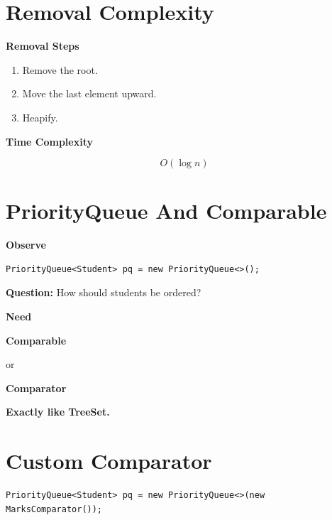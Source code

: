 \documentclass[11pt,a4paper]{book}
\newcommand{\question}[1]{
\vspace{0.5em}
\textbf{Question:} #1?
\vspace{0.2em}
}
\begin{document}
\section{Removal Complexity}

\textcolor{RosettaBlue}{\textbf{Removal Steps}}

\begin{enumerate}[leftmargin=2em]
    \item Remove the root.
    \item Move the last element upward.
    \item Heapify.
\end{enumerate}

\medskip

\textcolor{RosettaDeepGreen}{\textbf{Time Complexity}}

\[
\boxed{O(\log n)}
\]
\section{PriorityQueue And Comparable}

\textcolor{RosettaBlue}{\textbf{Observe}}

\begin{verbatim}
PriorityQueue<Student> pq = new PriorityQueue<>();
\end{verbatim}
\question{How should students be ordered}

\medskip

\textcolor{RosettaJade}{\textbf{Need}}

\begin{center}
\Large
\textbf{Comparable}

\vspace{0.4em}

\textcolor{RosettaGray}{or}

\vspace{0.4em}

\textbf{Comparator}
\end{center}

\medskip

\textcolor{RosettaRoyalPurple}{\textbf{Exactly like TreeSet.}}
\section{Custom Comparator}

\begin{verbatim}
PriorityQueue<Student> pq = new PriorityQueue<>(new MarksComparator());
\end{verbatim}
\end{document}
